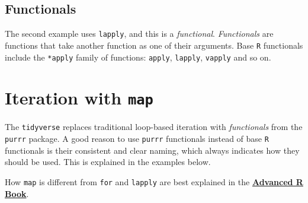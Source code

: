 \documentclass[]{book}
\newenvironment{Shaded}{}{}
\newcommand{\CommentTok}[1]{\textcolor[rgb]{0.38,0.63,0.69}{\textit{#1}}}
\newcommand{\ControlFlowTok}[1]{\textcolor[rgb]{0.00,0.44,0.13}{\textbf{#1}}}
\newcommand{\DataTypeTok}[1]{\textcolor[rgb]{0.56,0.13,0.00}{#1}}
\newcommand{\KeywordTok}[1]{\textcolor[rgb]{0.00,0.44,0.13}{\textbf{#1}}}
\newcommand{\NormalTok}[1]{#1}
\newcommand{\OperatorTok}[1]{\textcolor[rgb]{0.40,0.40,0.40}{#1}}
\begin{document}
\begin{Shaded}
\end{Shaded}

\hypertarget{functionals}{%
\subsection*{Functionals}\label{functionals}}

The second example uses \texttt{lapply}, and this is a \emph{functional}. \emph{Functionals} are functions that take another function as one of their arguments. Base \texttt{R} functionals include the \texttt{*apply} family of functions: \texttt{apply}, \texttt{lapply}, \texttt{vapply} and so on.

\hypertarget{iteration-with-map}{%
\section{\texorpdfstring{Iteration with \texttt{map}}{Iteration with map}}\label{iteration-with-map}}

The \texttt{tidyverse} replaces traditional loop-based iteration with \emph{functionals} from the \texttt{purrr} package. A good reason to use \texttt{purrr} functionals instead of base \texttt{R} functionals is their consistent and clear naming, which always indicates how they should be used.
This is explained in the examples below.

How \texttt{map} is different from \texttt{for} and \texttt{lapply} are best explained in the \textbf{\href{https://adv-r.hadley.nz/functionals.html}{Advanced R Book}}.
\end{document}
